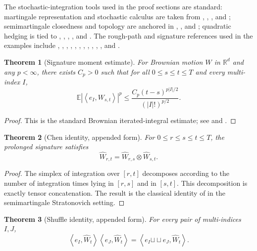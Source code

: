 \documentclass[11pt,oneside]{article}
\theoremstyle{plain}
\newtheorem{theorem}{Theorem}[section]
\theoremstyle{definition}
\theoremstyle{remark}
\newcommand{\R}{\mathbb{R}}
\newcommand{\E}{\mathbb{E}}
\newcommand{\cW}{\widehat W}
\newcommand{\sh}{\mathbin{\sqcup\!\sqcup}}
\newcommand{\abs}[1]{\left\lvert #1\right\rvert}
\newcommand{\inner}[2]{\left\langle #1,#2\right\rangle}
\begin{document}
The stochastic-integration tools used in the proof sections are standard: martingale representation and stochastic calculus are taken from \citet{KaratzasShreve1998}, \citet{RevuzYor1999}, \citet{JacodShiryaev2003}, and \citet{Protter2005}; semimartingale closedness and topology are anchored in \citet{Emery1979}, \citet{Memin1980}, and \citet{Stricker1990}; quadratic hedging is tied to \citet{FoellmerSondermann1986}, \citet{FoellmerSchweizer1991}, \citet{KunitaWatanabe1967}, \citet{Schweizer2001}, and \citet{HeathSchweizer2000}. The rough-path and signature references used in the examples include \citet{LyonsQian2002}, \citet{HairerFriz2014}, \citet{BonnierKidgerPerezSalviLyons2019}, \citet{SalviCassFosterLyonsYang2021}, \citet{KalsiLyonsPerezArribas2020}, \citet{PerezArribasSalviSzpruch2020}, \citet{CoutinQian2002}, \citet{BayerFrizGulisashviliHorvathStemper2019}, \citet{FordeZhang2017}, \citet{JacquierPannier2022}, \citet{CuchieroLarssonSvalutoFerro2021}, and \citet{FilipovicLarssonTrolle2017}.

\begin{theorem}[Signature moment estimate]
For Brownian motion $W$ in $\R^d$ and any $p<\infty$, there exists $C_p>0$ such that for all $0\leq s\leq t\leq T$ and every multi-index $I$,
\[
\E\abs{\inner{e_I}{W_{s,t}}}^p\leq \frac{C_p(t-s)^{p|I|/2}}{(|I|!)^{p/2}}.
\]
\end{theorem}

\begin{proof}
This is the standard Brownian iterated-integral estimate; see \citet[Chapter 4]{FrizVictoir2010} and \citet[Chapter 3]{FrizHairer2020}.
\end{proof}



\begin{theorem}[Chen identity, appended form]
For $0\leq r\leq s\leq t\leq T$, the prolonged signature satisfies
\[
\cW_{r,t}=\cW_{r,s}\otimes \cW_{s,t}.
\]
\end{theorem}

\begin{proof}
The simplex of integration over $[r,t]$ decomposes according to the number of integration times lying in $[r,s]$ and in $[s,t]$. This decomposition is exactly tensor concatenation. The result is the classical identity of \citet{Chen1977} in the semimartingale Stratonovich setting.
\end{proof}

\begin{theorem}[Shuffle identity, appended form]
For every pair of multi-indices $I,J$,
\[
\inner{e_I}{\cW_t}\inner{e_J}{\cW_t}=\inner{e_I\sh e_J}{\cW_t}.
\]
\end{theorem}
\end{document}
